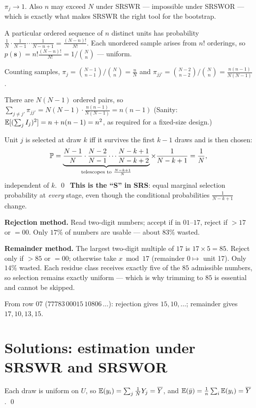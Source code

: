  $\pi_j\to1$. Also $n$ may exceed $N$ under SRSWR --- impossible under SRSWOR --- which is
exactly what makes SRSWR the right tool for the bootstrap.

 A particular ordered sequence of $n$ distinct units has probability
$\frac1N\cdot\frac1{N-1}\cdots\frac1{N-n+1}=\frac{(N-n)!}{N!}$. Each unordered sample arises from
$n!$ orderings, so $p(\bm s)=n!\frac{(N-n)!}{N!}=1/\binom Nn$ --- uniform.

 Counting samples,
$\pi_j=\binom{N-1}{n-1}/\binom Nn=\frac nN$ and
$\pi_{jj'}=\binom{N-2}{n-2}/\binom Nn=\frac{n(n-1)}{N(N-1)}$.

 There are $N(N-1)$ ordered pairs, so
$\sum_{j\ne j'}\pi_{jj'}=N(N-1)\cdot\frac{n(n-1)}{N(N-1)}=n(n-1)$ \checkmark
(Sanity: $\mathbb{E}[(\sum_jI_j)^2]=n+n(n-1)=n^2$, as required for a fixed-size design.)

\sol Unit $j$ is selected at draw $k$ iff it survives the first $k-1$ draws and is then chosen:
\[
  \mathbb{P}=\underbrace{\frac{N-1}{N}\cdot\frac{N-2}{N-1}\cdots\frac{N-k+1}{N-k+2}}_{\text{telescopes to }\frac{N-k+1}{N}}
  \times\frac{1}{N-k+1}=\frac1N ,
\]
independent of $k$. \qed \ \textbf{This is the ``S'' in SRS}: equal marginal selection probability
at \emph{every} stage, even though the conditional probabilities $\frac1{N-k+1}$ change.

\sol \textbf{Rejection method.} Read two-digit numbers; accept if in $01$--$17$, reject if $>17$
or $=00$. Only $17\%$ of numbers are usable --- about $83\%$ wasted.

\textbf{Remainder method.} The largest two-digit multiple of $17$ is $17\times5=85$. Reject only
if $>85$ or $=00$; otherwise take $x\bmod17$ (remainder $0\mapsto$ unit 17). Only $14\%$ wasted.
Each residue class receives exactly five of the $85$ admissible numbers, so selection remains
exactly uniform --- which is why trimming to $85$ is essential and cannot be skipped.

From row 07 ($77783\,00015\,10806\,\dots$): rejection gives $15,10,\dots$; remainder gives
$17,10,13,15$.

\section{Solutions: estimation under SRSWR and SRSWOR}
\setcounter{qq}{0}

 Each draw is uniform on $U$, so $\mathbb{E}(y_i)=\sum_j\frac1NY_j=\overline{Y}$, and
$\mathbb{E}(\bar{y})=\frac1n\sum_i\mathbb{E}(y_i)=\overline{Y}$. \qed

